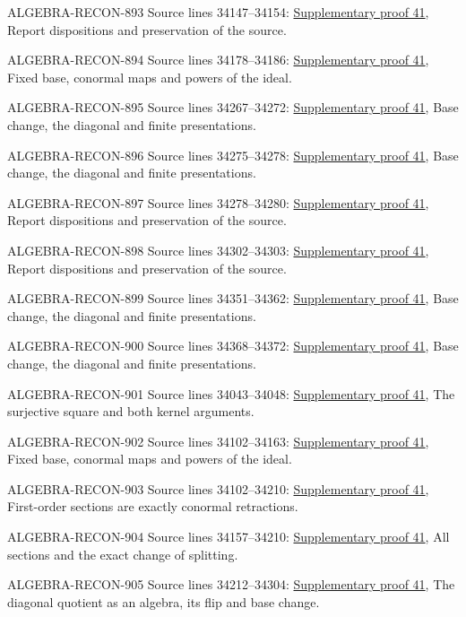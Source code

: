 \begin{AlgebraSourceRoutes}
\item[ALGEBRA-RECON-893] Source lines 34147--34154: \hyperlink{algebra_differentials_notes_20260928}{Supplementary proof 41}, Report dispositions and preservation of the source.
\item[ALGEBRA-RECON-894] Source lines 34178--34186: \hyperlink{algebra_differentials_notes_20260928}{Supplementary proof 41}, Fixed base, conormal maps and powers of the ideal.
\item[ALGEBRA-RECON-895] Source lines 34267--34272: \hyperlink{algebra_differentials_notes_20260928}{Supplementary proof 41}, Base change, the diagonal and finite presentations.
\item[ALGEBRA-RECON-896] Source lines 34275--34278: \hyperlink{algebra_differentials_notes_20260928}{Supplementary proof 41}, Base change, the diagonal and finite presentations.
\item[ALGEBRA-RECON-897] Source lines 34278--34280: \hyperlink{algebra_differentials_notes_20260928}{Supplementary proof 41}, Report dispositions and preservation of the source.
\item[ALGEBRA-RECON-898] Source lines 34302--34303: \hyperlink{algebra_differentials_notes_20260928}{Supplementary proof 41}, Report dispositions and preservation of the source.
\item[ALGEBRA-RECON-899] Source lines 34351--34362: \hyperlink{algebra_differentials_notes_20260928}{Supplementary proof 41}, Base change, the diagonal and finite presentations.
\item[ALGEBRA-RECON-900] Source lines 34368--34372: \hyperlink{algebra_differentials_notes_20260928}{Supplementary proof 41}, Base change, the diagonal and finite presentations.
\item[ALGEBRA-RECON-901] Source lines 34043--34048: \hyperlink{algebra_differentials_notes_20260928}{Supplementary proof 41}, The surjective square and both kernel arguments.
\item[ALGEBRA-RECON-902] Source lines 34102--34163: \hyperlink{algebra_differentials_notes_20260928}{Supplementary proof 41}, Fixed base, conormal maps and powers of the ideal.
\item[ALGEBRA-RECON-903] Source lines 34102--34210: \hyperlink{algebra_differentials_notes_20260928}{Supplementary proof 41}, First-order sections are exactly conormal retractions.
\item[ALGEBRA-RECON-904] Source lines 34157--34210: \hyperlink{algebra_differentials_notes_20260928}{Supplementary proof 41}, All sections and the exact change of splitting.
\item[ALGEBRA-RECON-905] Source lines 34212--34304: \hyperlink{algebra_differentials_notes_20260928}{Supplementary proof 41}, The diagonal quotient as an algebra, its flip and base change.
\end{AlgebraSourceRoutes}

